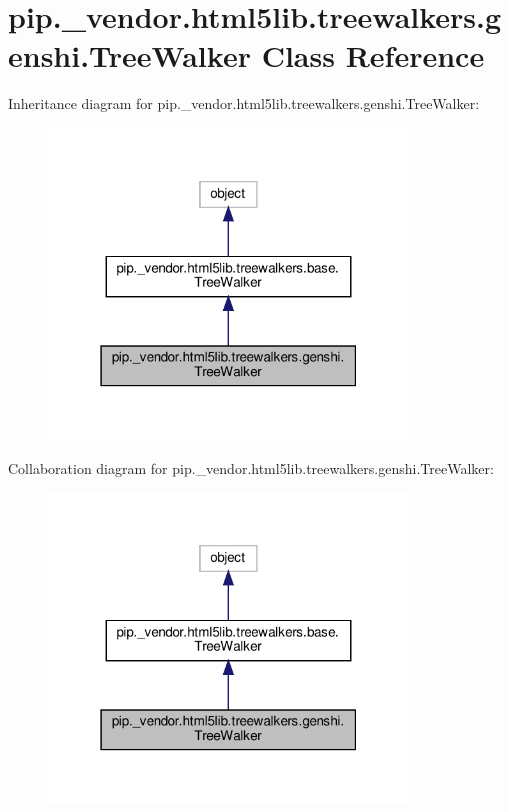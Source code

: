 \hypertarget{classpip_1_1__vendor_1_1html5lib_1_1treewalkers_1_1genshi_1_1TreeWalker}{}\section{pip.\+\_\+vendor.\+html5lib.\+treewalkers.\+genshi.\+Tree\+Walker Class Reference}
\label{classpip_1_1__vendor_1_1html5lib_1_1treewalkers_1_1genshi_1_1TreeWalker}


Inheritance diagram for pip.\+\_\+vendor.\+html5lib.\+treewalkers.\+genshi.\+Tree\+Walker\+:
\nopagebreak
\begin{figure}[H]
\begin{center}
\leavevmode
\includegraphics[width=271pt]{classpip_1_1__vendor_1_1html5lib_1_1treewalkers_1_1genshi_1_1TreeWalker__inherit__graph}
\end{center}
\end{figure}


Collaboration diagram for pip.\+\_\+vendor.\+html5lib.\+treewalkers.\+genshi.\+Tree\+Walker\+:
\nopagebreak
\begin{figure}[H]
\begin{center}
\leavevmode
\includegraphics[width=271pt]{classpip_1_1__vendor_1_1html5lib_1_1treewalkers_1_1genshi_1_1TreeWalker__coll__graph}
\end{center}
\end{figure}
